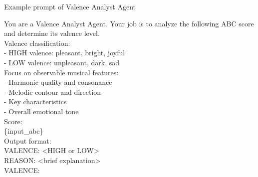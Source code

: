 \documentclass[sigconf]{acmart}
\begin{document}
\begin{promptbox}{Example prompt of Valence Analyst Agent}

You are a Valence Analyst Agent. Your job is to analyze the following ABC score and determine its valence level.\\

Valence classification:\\
- HIGH valence: pleasant, bright, joyful\\
- LOW valence: unpleasant, dark, sad\\

Focus on observable musical features:\\
- Harmonic quality and consonance\\
- Melodic contour and direction\\
- Key characteristics\\
- Overall emotional tone\\

Score:\\
\{input\_abc\}\\

Output format:\\
VALENCE: <HIGH or LOW>\\
REASON: <brief explanation>\\

VALENCE:
\end{promptbox}
\end{document}
